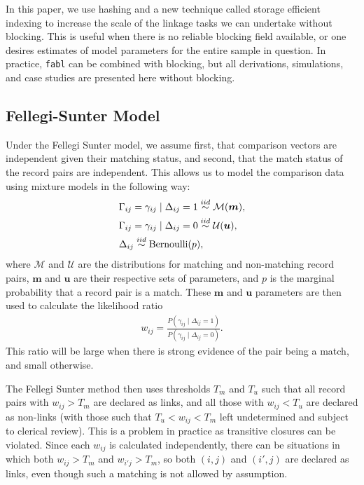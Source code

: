 \documentclass[ba]{imsart}
\begin{document}
In this paper, we use hashing and a new technique called storage efficient indexing to increase the scale of the linkage tasks we can undertake without blocking. This is useful when there is no reliable blocking field available, or one desires estimates of model parameters for the entire sample in question. In practice, \texttt{fabl} can be combined with blocking, but all derivations, simulations, and case studies are presented here without blocking. 

\subsection{Fellegi-Sunter Model}
\label{fellegi-sunter}

Under the Fellegi Sunter model, we assume first, that comparison vectors are independent given their matching status, and second, that the match status of the record pairs are independent. This allows us to model the comparison data using mixture models in the following way:
\begin{align}
	&\Gamma_{ij} = \gamma_{ij} \mid \Delta_{ij} = 1 \stackrel{iid}{\sim} \mathcal{M}(\bm{m}), \\
	&\Gamma_{ij} = \gamma_{ij} \mid \Delta_{ij} = 0  \stackrel{iid}{\sim} \mathcal{U}(\bm{u}), \notag\\
	& \Delta_{ij}   \stackrel{iid}{\sim} \text{Bernoulli}(p), \notag
\end{align}
where $\mathcal{M}$ and $\mathcal{U}$ are the distributions for matching and non-matching record pairs, $\bm{m}$ and $\bm{u}$ are their respective sets of parameters, and $p$ is the marginal probability that a record pair is a match. These $\bm{m}$ and $\bm{u}$ parameters are then used to calculate the likelihood ratio  
\begin{align}
	\label{eqn:wts}
	w_{ij} = \frac{P(\gamma_{ij} \mid \Delta_{ij} = 1)}{P(\gamma_{ij} \mid \Delta_{ij} = 0)}.
\end{align}
This ratio will be large when there is strong evidence of the pair being a match, and small otherwise. 

The Fellegi Sunter method then uses thresholds $T_m$ and $T_u$ such that all record pairs with $w_{ij} > T_m$ are declared as links, and all those with $w_{ij} < T_u$ are declared as non-links (with those such that $T_u < w_{ij} < T_m$ left undetermined and subject to clerical review). This is a problem in practice as transitive closures can be violated. Since each $w_{ij}$ is calculated independently, there can be situations in which both $w_{ij} > T_m$ and $w_{i'j} > T_m$, so both $(i,j)$ and $(i', j)$ are declared as links, even though such a matching is not allowed by assumption. 
\end{document}
